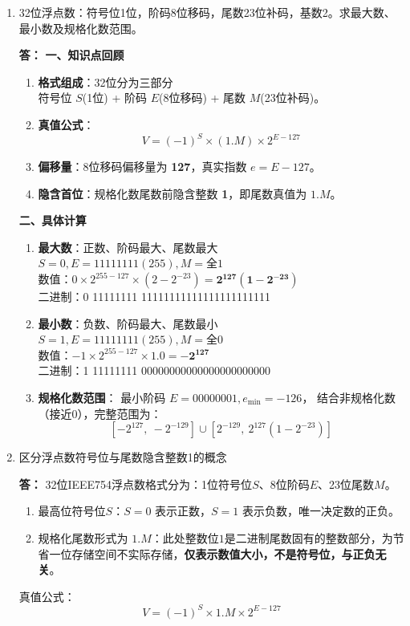 \documentclass{article}
\begin{document}
\begin{enumerate}
    \item 32位浮点数：符号位1位，阶码8位移码，尾数23位补码，基数2。求最大数、最小数及规格化数范围。
    
    \textbf{答：}
    \textbf{一、知识点回顾}
    \begin{enumerate}[label=(\arabic*)]
        \item \textbf{格式组成}：32位分为三部分 \\
             符号位 $S$(1位) + 阶码 $E$(8位移码) + 尾数 $M$(23位补码)。
        \item \textbf{真值公式}：
             \[ V = (-1)^S \times (1.M) \times 2^{E - 127} \]
        \item \textbf{偏移量}：8位移码偏移量为 \textbf{127}，真实指数 $e = E - 127$。
        \item \textbf{隐含首位}：规格化数尾数前隐含整数 \textbf{1}，即尾数真值为 $1.M$。
    \end{enumerate}

    \textbf{二、具体计算}
    \begin{enumerate}[label=(\arabic*)]
        \item \textbf{最大数}：正数、阶码最大、尾数最大 \\
             $S=0, E=11111111(255), M=\text{全1}$ \\
             数值：$0 \times 2^{255-127} \times (2-2^{-23}) = \boldsymbol{2^{127}(1-2^{-23})}$ \\
             二进制：0 11111111 11111111111111111111111
        
        \item \textbf{最小数}：负数、阶码最大、尾数最小 \\
             $S=1, E=11111111(255), M=\text{全0}$ \\
             数值：$-1 \times 2^{255-127} \times 1.0 = \boldsymbol{-2^{127}}$ \\
             二进制：1 11111111 00000000000000000000000
        
        \item \textbf{规格化数范围}：
             最小阶码 $E=00000001, e_{\text{min}}=-126$，
             结合非规格化数（接近0），完整范围为：
             \[ [-2^{127},\ -2^{-129}] \cup [2^{-129},\ 2^{127}(1-2^{-23})] \]
    \end{enumerate}

    \item 区分浮点数符号位与尾数隐含整数1的概念

    \textbf{答：}
        32位IEEE754浮点数格式分为：1位符号位$S$、8位阶码$E$、23位尾数$M$。
    \begin{enumerate}[label=(\arabic*)]
    \item 最高位符号位$S$：$S=0$ 表示正数，$S=1$ 表示负数，唯一决定数的正负。
    \item 规格化尾数形式为 $1.M$：此处整数位$1$是二进制尾数固有的整数部分，为节省一位存储空间不实际存储，\textbf{仅表示数值大小，不是符号位，与正负无关}。
    \end{enumerate}
真值公式：
\[
V = (-1)^S \times 1.M \times 2^{E-127}
\]
\end{enumerate}
\end{document}
